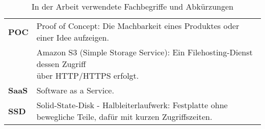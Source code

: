 \begin{table}[!htbp]
\begin{tabular}{p{}p{}}
	\textbf{POC} & Proof of Concept: Die Machbarkeit eines Produktes oder einer Idee aufzeigen.\\
	\makecell[l]{\textbf{S3}} & \makecell[l]{Amazon S3 (Simple Storage Service): Ein Filehosting-Dienst dessen Zugriff\\ über HTTP/HTTPS erfolgt.}\\
	\textbf{SaaS} & Software as a Service.\\
	\textbf{SSD} &  Solid-State-Disk - Halbleiterlaufwerk: Festplatte ohne bewegliche Teile, dafür mit kurzen Zugriffszeiten.\\
\end{tabular}
\caption{\label{tab:fachbegriffe}In der Arbeit verwendete Fachbegriffe und Abkürzungen}
\end{table}